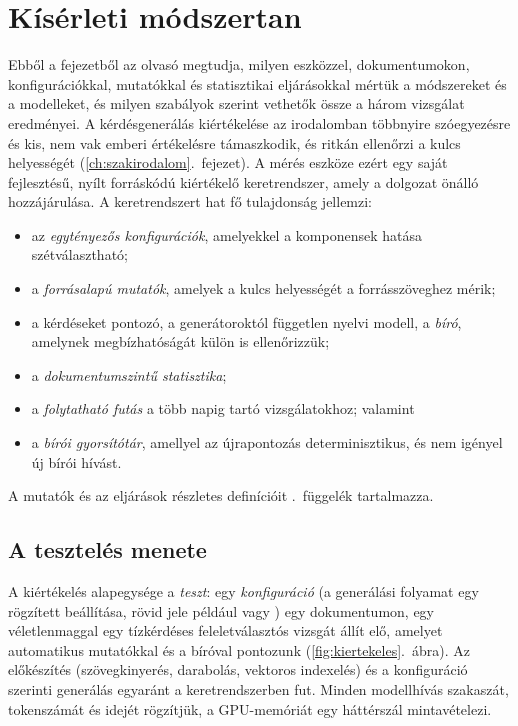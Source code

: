 \chapter{Kísérleti módszertan}
\label{ch:kiertekeles}

Ebből a fejezetből az olvasó megtudja, milyen eszközzel, dokumentumokon, konfigurációkkal, mutatókkal és
statisztikai eljárásokkal mértük a módszereket és a modelleket, és milyen szabályok szerint vethetők össze
a három vizsgálat eredményei. A kérdésgenerálás kiértékelése az irodalomban többnyire szóegyezésre és kis,
nem vak emberi értékelésre támaszkodik, és ritkán ellenőrzi a kulcs helyességét
(\ref{ch:szakirodalom}.~fejezet). A mérés eszköze ezért egy saját fejlesztésű, nyílt forráskódú kiértékelő
keretrendszer, amely a dolgozat önálló
hozzájárulása. A keretrendszert hat fő tulajdonság jellemzi:
\begin{itemize}[leftmargin=*,itemsep=1pt,topsep=2pt]
\item az \emph{egytényezős konfigurációk}, amelyekkel a komponensek hatása szétválasztható;
\item a \emph{forrásalapú mutatók}, amelyek a kulcs helyességét a forrásszöveghez mérik;
\item a kérdéseket pontozó, a generátoroktól független nyelvi modell, a \emph{bíró}, amelynek megbízhatóságát külön is ellenőrizzük;
\item a \emph{dokumentumszintű statisztika};
\item a \emph{folytatható futás} a több napig tartó vizsgálatokhoz; valamint
\item a \emph{bírói gyorsítótár}, amellyel az újrapontozás determinisztikus, és nem igényel új bírói hívást.
\end{itemize}
A mutatók és az eljárások részletes definícióit \az{\ref{app-modszer}}.~függelék tartalmazza.

\section{A tesztelés menete}
\label{sec:harness}

A kiértékelés alapegysége a \emph{teszt}: egy \emph{konfiguráció} (a generálási folyamat egy rögzített
beállítása, rövid jele például  vagy ) egy dokumentumon, egy véletlenmaggal egy
tízkérdéses feleletválasztós vizsgát állít elő, amelyet automatikus mutatókkal és a bíróval pontozunk
(\ref{fig:kiertekeles}.~ábra). Az előkészítés (szövegkinyerés, darabolás, vektoros indexelés) és a
konfiguráció szerinti generálás egyaránt a keretrendszerben fut. Minden modellhívás szakaszát, tokenszámát és idejét
rögzítjük, a GPU-memóriát egy háttérszál mintavételezi.

